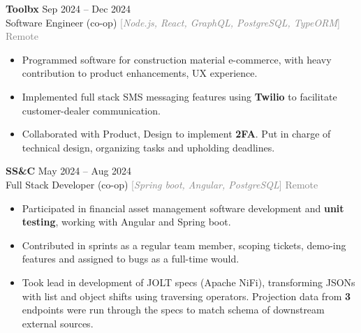 \documentclass[9pt]{developercv} %
\begin{document}
\begin{minipage}[t]{\textwidth}
	\vspace{-\baselineskip}

	\textbf{Toolbx} \hfill Sep 2024 -- Dec 2024 \\
	Software Engineer (co-op) \quad \textcolor{gray}{[\;\textit{Node.js, React, GraphQL, PostgreSQL, TypeORM}\;]} \hfill \textcolor{gray}{Remote}
	\begin{itemize}[noitemsep,topsep=0pt]
		\item Programmed software for construction material e-commerce,
		with heavy contribution to product enhancements, UX experience.
		\item Implemented full stack SMS messaging features using \textbf{Twilio} to facilitate customer-dealer communication.
		\item Collaborated with Product, Design to implement \textbf{2FA}. Put in charge of technical design, organizing tasks and upholding deadlines.
	\end{itemize}
	\vspace{0.3em}

	\textbf{SS\&C} \hfill May 2024 -- Aug 2024 \\
	Full Stack Developer (co-op) \quad \textcolor{gray}{[\;\textit{Spring boot, Angular, PostgreSQL}\;]} \hfill \textcolor{gray}{Remote}
	\begin{itemize}[noitemsep,topsep=0pt]
		\item Participated in financial asset management software development and \textbf{unit testing}, working with Angular and Spring boot.
		\item Contributed in sprints as a regular team member, scoping tickets, demo-ing features and assigned to bugs as a full-time would.
		\item Took lead in development of JOLT specs (Apache NiFi), transforming JSONs with list and object shifts using traversing operators.
		Projection data from \textbf{3} endpoints were run through the specs to match schema of downstream external sources.
	\end{itemize}
	\vspace{0.3em}


\end{minipage}
\end{document}
